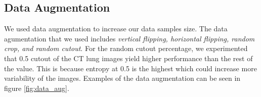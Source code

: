 \subsection{Data Augmentation}
We used data augmentation to increase our data samples size. The data agumentation that we used includes \textit{vertical flipping, horizontal flipping, random crop, and random cutout}. For the random cutout percentage, we experimented that 0.5 cutout of the CT lung images yield higher performance than the rest of the value. This is because entropy at 0.5 is the highest which could increase more variability of the images. Examples of the data augmentation can be seen in figure \ref{fig:data_aug}.

